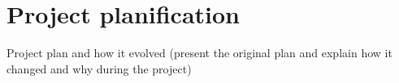 \chapter{Project planification}
Project plan and how it evolved (present the original plan and explain how it changed and why during the project)